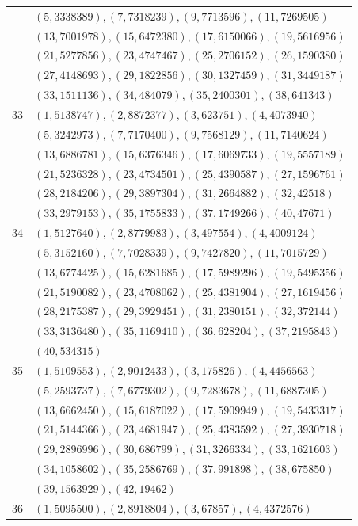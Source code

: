 \begin{longtable}{r p{}}
 & $(5,3338389), (7,7318239), (9,7713596), (11,7269505)$ \\[2pt]
 & $(13,7001978), (15,6472380), (17,6150066), (19,5616956)$ \\[2pt]
 & $(21,5277856), (23,4747467), (25,2706152), (26,1590380)$ \\[2pt]
 & $(27,4148693), (29,1822856), (30,1327459), (31,3449187)$ \\[2pt]
 & $(33,1511136), (34,484079), (35,2400301), (38,641343)$ \\[2pt]
33 & $(1,5138747), (2,8872377), (3,623751), (4,4073940)$ \\[2pt]
 & $(5,3242973), (7,7170400), (9,7568129), (11,7140624)$ \\[2pt]
 & $(13,6886781), (15,6376346), (17,6069733), (19,5557189)$ \\[2pt]
 & $(21,5236328), (23,4734501), (25,4390587), (27,1596761)$ \\[2pt]
 & $(28,2184206), (29,3897304), (31,2664882), (32,42518)$ \\[2pt]
 & $(33,2979153), (35,1755833), (37,1749266), (40,47671)$ \\[2pt]
34 & $(1,5127640), (2,8779983), (3,497554), (4,4009124)$ \\[2pt]
 & $(5,3152160), (7,7028339), (9,7427820), (11,7015729)$ \\[2pt]
 & $(13,6774425), (15,6281685), (17,5989296), (19,5495356)$ \\[2pt]
 & $(21,5190082), (23,4708062), (25,4381904), (27,1619456)$ \\[2pt]
 & $(28,2175387), (29,3929451), (31,2380151), (32,372144)$ \\[2pt]
 & $(33,3136480), (35,1169410), (36,628204), (37,2195843)$ \\[2pt]
 & $(40,534315)$ \\[2pt]
35 & $(1,5109553), (2,9012433), (3,175826), (4,4456563)$ \\[2pt]
 & $(5,2593737), (7,6779302), (9,7283678), (11,6887305)$ \\[2pt]
 & $(13,6662450), (15,6187022), (17,5909949), (19,5433317)$ \\[2pt]
 & $(21,5144366), (23,4681947), (25,4383592), (27,3930718)$ \\[2pt]
 & $(29,2896996), (30,686799), (31,3266334), (33,1621603)$ \\[2pt]
 & $(34,1058602), (35,2586769), (37,991898), (38,675850)$ \\[2pt]
 & $(39,1563929), (42,19462)$ \\[2pt]
36 & $(1,5095500), (2,8918804), (3,67857), (4,4372576)$ \\[2pt]

\end{longtable}
